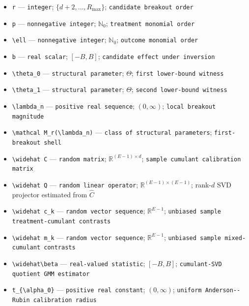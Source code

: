 \documentclass{article}
\begin{document}
\begin{itemize}
  \item \texttt{r} --- \texttt{integer}; \(\{d+2,\ldots,R_{\max}\}\); \texttt{candidate breakout order}
  \item \texttt{p} --- \texttt{nonnegative integer}; \(\mathbb N_0\); \texttt{treatment monomial order}
  \item \texttt{\textbackslash{}\allowbreak{}ell} --- \texttt{nonnegative integer}; \(\mathbb N_0\); \texttt{outcome monomial order}
  \item \texttt{b} --- \texttt{real scalar}; \([-B,B]\); \texttt{candidate effect under inversion}
  \item \texttt{\textbackslash{}\allowbreak{}theta\_\allowbreak{}0} --- \texttt{structural parameter}; \(\Theta\); \texttt{first lower-\allowbreak{}bound witness}
  \item \texttt{\textbackslash{}\allowbreak{}theta\_\allowbreak{}1} --- \texttt{structural parameter}; \(\Theta\); \texttt{second lower-\allowbreak{}bound witness}
  \item \texttt{\textbackslash{}\allowbreak{}lambda\_\allowbreak{}n} --- \texttt{positive real sequence}; \((0,\infty)\); \texttt{local breakout magnitude}
  \item \texttt{\textbackslash{}\allowbreak{}mathcal M\_\allowbreak{}r(\textbackslash{}\allowbreak{}lambda\_\allowbreak{}n)} --- \texttt{class of structural parameters}; \texttt{first-\allowbreak{}breakout shell}
  \item \texttt{\textbackslash{}\allowbreak{}widehat C} --- \texttt{random matrix}; \(\mathbb R^{(E-1)\times d}\); \texttt{sample cumulant calibration matrix}
  \item \texttt{\textbackslash{}\allowbreak{}widehat Q} --- \texttt{random linear operator}; \(\mathbb R^{(E-1)\times(E-1)}\); rank-\(d\) SVD projector estimated from \(\widehat C\)
  \item \texttt{\textbackslash{}\allowbreak{}widehat c\_\allowbreak{}k} --- \texttt{random vector sequence}; \(\mathbb R^{E-1}\); \texttt{unbiased sample treatment-\allowbreak{}cumulant contrasts}
  \item \texttt{\textbackslash{}\allowbreak{}widehat m\_\allowbreak{}k} --- \texttt{random vector sequence}; \(\mathbb R^{E-1}\); \texttt{unbiased sample mixed-\allowbreak{}cumulant contrasts}
  \item \texttt{\textbackslash{}\allowbreak{}widehat\textbackslash{}\allowbreak{}beta} --- \texttt{real-\allowbreak{}valued statistic}; \([-B,B]\); \texttt{cumulant-\allowbreak{}SVD quotient GMM estimator}
  \item \texttt{t\_\allowbreak{}\{\textbackslash{}\allowbreak{}alpha\_\allowbreak{}0\}\allowbreak{}} --- \texttt{positive real constant}; \((0,\infty)\); \texttt{uniform Anderson-\allowbreak{}-\allowbreak{}Rubin calibration radius}

\end{itemize}
\end{document}
